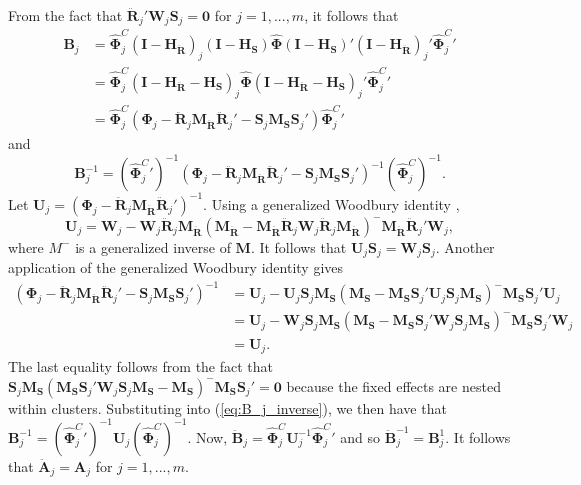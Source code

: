 \documentclass[12pt]{article}\usepackage[]{graphicx}\usepackage[]{color}
\newcommand{\bm}{\mathbf}
\newcommand{\bs}{\boldsymbol}
\begin{document}
From the fact that $\bm{\ddot{R}}_j'\bm{W}_j\bm{S}_j = \bm{0}$ for $j = 1,...,m$, it follows that \begin{align*}
\bm{B}_j &= \bs{\hat\Phi}_j^C \left(\bm{I} - \bm{H_{\ddot{R}}}\right)_j \left(\bm{I} - \bm{H_S}\right) \hat{\bs\Phi} \left(\bm{I} - \bm{H_S}\right)' \left(\bm{I} - \bm{H_{\ddot{R}}}\right)_j' {\bs{\hat\Phi}_j^C}'\\
&= \bs{\hat\Phi}_j^C\left(\bm{I} - \bm{H_{\ddot{R}}} - \bm{H_S}\right)_j \hat{\bs\Phi} \left(\bm{I} - \bm{H_{\ddot{R}}} - \bm{H_S}\right)_j' {\bs{\hat\Phi}_j^C}' \\
&= \bs{\hat\Phi}_j^C \left(\bs\Phi_j - \bm{\ddot{R}}_j \bm{M_{\ddot{R}}}\bm{\ddot{R}}_j' - \bm{S}_j \bm{M_S}\bm{S}_j'\right){\bs{\hat\Phi}_j^C}'
\end{align*}
and 
\begin{equation}
\label{eq:B_j_inverse}
\bm{B}_j^{-1} = \left({\bs{\hat\Phi}_j^C}'\right)^{-1} \left(\bs\Phi_j - \bm{\ddot{R}}_j \bm{M_{\ddot{R}}}\bm{\ddot{R}}_j' - \bm{S}_j \bm{M_S}\bm{S}_j'\right)^{-1}\left(\bs{\hat\Phi}_j^C\right)^{-1}.
\end{equation}
Let $\bm{U}_j = \left(\bs\Phi_j - \bm{\ddot{R}}_j \bm{M_{\ddot{R}}}\bm{\ddot{R}}_j'\right)^{-1}$.
Using a generalized Woodbury identity \citep{Henderson1981on}, \[
\bm{U}_j = \bm{W}_j - \bm{W}_j \bm{\ddot{R}}_j \bm{M_{\ddot{R}}}\left(\bm{M_{\ddot{R}}} - \bm{M_{\ddot{R}}} \bm{\ddot{R}}_j \bm{W}_j \bm{\ddot{R}}_j \bm{M_{\ddot{R}}}\right)^{-} \bm{M_{\ddot{R}}}\bm{\ddot{R}}_j'\bm{W}_j, \]
where ${M}^{-}$ is a generalized inverse of $\bm{M}$. 
It follows that $\bm{U}_j \bm{S}_j = \bm{W}_j \bm{S}_j$. 
Another application of the generalized Woodbury identity gives 
\begin{align*}
\left(\bs\Phi_j - \bm{\ddot{R}}_j \bm{M_{\ddot{R}}}\bm{\ddot{R}}_j' - \bm{S}_j \bm{M_S}\bm{S}_j'\right)^{-1} &= \bm{U}_j - \bm{U}_j \bm{S}_j \bm{M_S}\left(\bm{M_S} - \bm{M_S}\bm{S}_j' \bm{U}_j \bm{S}_j\bm{M_S}\right)^{-} \bm{M_S} \bm{S}_j' \bm{U}_j \\
&= \bm{U}_j - \bm{W}_j \bm{S}_j \bm{M_S}\left(\bm{M_S} - \bm{M_S}\bm{S}_j' \bm{W}_j \bm{S}_j\bm{M_S}\right)^{-} \bm{M_S} \bm{S}_j' \bm{W}_j \\
&= \bm{U}_j.
\end{align*}
The last equality follows from the fact that $\bm{S}_j \bm{M_S}\left(\bm{M_S}\bm{S}_j' \bm{W}_j \bm{S}_j\bm{M_S} - \bm{M_S}\right)^{-} \bm{M_S} \bm{S}_j' = \bm{0}$ because the fixed effects are nested within clusters. 
Substituting into (\ref{eq:B_j_inverse}), we then have that $\bm{B}_j^{-1} = \left({\bs{\hat\Phi}_j^C}'\right)^{-1} \bm{U}_j \left(\bs{\hat\Phi}_j^C\right)^{-1}$. 
Now, $\bm{\ddot{B}}_j = \hat{\bs\Phi}_j^C \bm{U}_j^{-1} {\bs{\hat\Phi}_j^C}'$ and so $\bm{\ddot{B}}_j^{-1} = \bm{B}_j^{1}$. It follows that $\bm{\ddot{A}}_j = \bm{A}_j$ for $j = 1,...,m$. 



\end{document}
